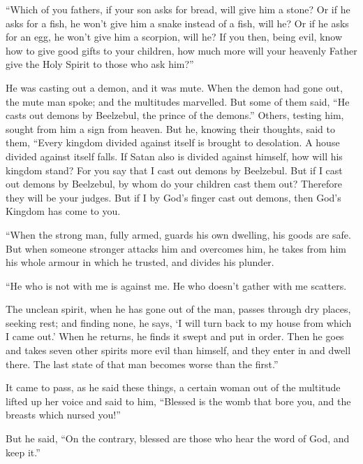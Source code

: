  ``Which of you fathers, if your son asks for bread, will
give him a stone? Or if he asks for a fish, he won't give him a snake
instead of a fish, will he?  Or if he asks for an egg, he
won't give him a scorpion, will he?  If you then, being
evil, know how to give good gifts to your children, how much more will
your heavenly Father give the Holy Spirit to those who ask him?''

 He was casting out a demon, and it was mute. When the
demon had gone out, the mute man spoke; and the multitudes marvelled.
 But some of them said, ``He casts out demons by Beelzebul,
the prince of the demons.''  Others, testing him, sought
from him a sign from heaven.  But he, knowing their
thoughts, said to them, ``Every kingdom divided against itself is
brought to desolation. A house divided against itself falls.
 If Satan also is divided against himself, how will his
kingdom stand? For you say that I cast out demons by Beelzebul.
 But if I cast out demons by Beelzebul, by whom do your
children cast them out? Therefore they will be your judges.
 But if I by God's finger cast out demons, then God's
Kingdom has come to you.

 ``When the strong man, fully armed, guards his own
dwelling, his goods are safe.  But when someone stronger
attacks him and overcomes him, he takes from him his whole armour in
which he trusted, and divides his plunder.

 ``He who is not with me is against me. He who doesn't
gather with me scatters.

 The unclean spirit, when he has gone out of the man,
passes through dry places, seeking rest; and finding none, he says, `I
will turn back to my house from which I came out.'  When he
returns, he finds it swept and put in order.  Then he goes
and takes seven other spirits more evil than himself, and they enter in
and dwell there. The last state of that man becomes worse than the
first.''

 It came to pass, as he said these things, a certain woman
out of the multitude lifted up her voice and said to him, ``Blessed is
the womb that bore you, and the breasts which nursed you!''

 But he said, ``On the contrary, blessed are those who hear
the word of God, and keep it.''

